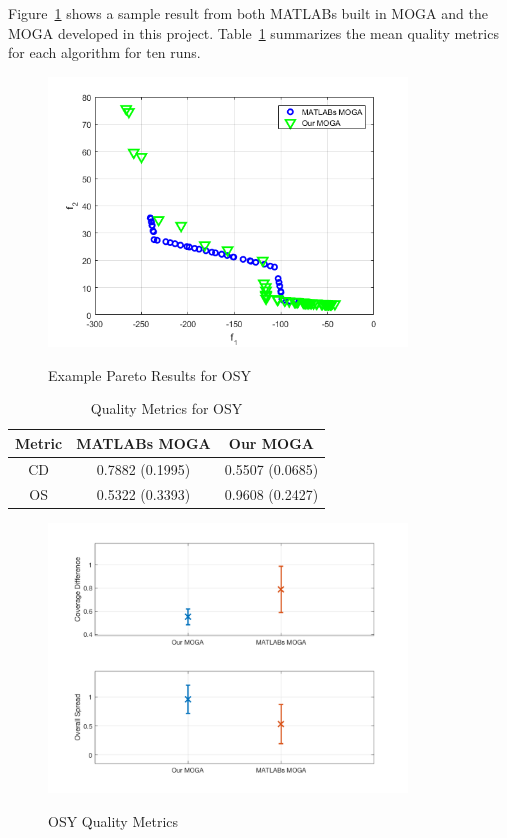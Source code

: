 \documentclass{article}
\begin{document}
\noindent Figure~\ref{fig:OSY} shows a sample result from both MATLABs built in MOGA and the MOGA developed in this project. Table~\ref{tab:OSY} summarizes the mean quality metrics for each algorithm for ten runs.
\begin{figure}[h]
  \caption{Example Pareto Results for OSY}
  \centering
  \includegraphics[width=0.85\textwidth]{OSY_pareto_final.png}  
  \label{fig:OSY}
\end{figure}

\begin{table}[H]
\caption{Quality Metrics for OSY} 
\centering 
\begin{tabular}{|c|c|c|} 
\hline\hline  
Metric & MATLABs MOGA & Our MOGA \\ \hline
CD & 0.7882 (0.1995) & 0.5507 (0.0685)  \\ \hline
OS & 0.5322 (0.3393) & 0.9608 (0.2427) \\ \hline
\end{tabular}
\label{tab:OSY} 
\end{table}
\begin{figure}[H]
  \caption{OSY Quality Metrics}
  \centering
  \includegraphics[width=0.85\textwidth]{OSY_QM.png}  
  \label{fig:OSY_QM}
\end{figure}
\newpage
\end{document}
